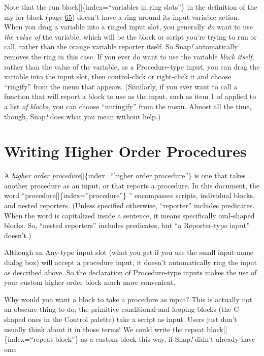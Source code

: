 \documentclass[
  letterpaper,
]{book}
\begin{document}
Note that the run block{[}{]}\{index=``variables in ring slots''\} in
the definition of the my for block (page \hyperref[call-and-run]{65})
doesn't have a ring around its input variable action. When you drag a
variable into a ringed input slot, you generally \emph{do} want to use
\emph{the value of} the variable, which will be the block or script
you're trying to run or call, rather than the orange variable reporter
itself. So Snap\emph{!} automatically removes the ring in this case. If
you ever do want to use the variable \emph{block itself,} rather than
the value of the variable, as a Procedure-type input, you can drag the
variable into the input slot, then control-click or right-click it and
choose ``ringify'' from the menu that appears. (Similarly, if you ever
want to call a function that will report a block to use as the input,
such as item 1 of applied to a list \emph{of blocks,} you can choose
``unringify'' from the menu. Almost all the time, though, Snap\emph{!}
does what you mean without help.)

\section{Writing Higher Order
Procedures}\label{writing-higher-order-procedures}

A \emph{higher order procedure}{[}{]}\{index=``higher order
procedure''\} is one that takes another procedure as an input, or that
reports a procedure. In this document, the word
``procedure{[}{]}\{index=''procedure''\} '' encompasses scripts,
individual blocks, and nested reporters. (Unless specified otherwise,
``reporter'' includes predicates. When the word is capitalized inside a
sentence, it means specifically oval-shaped blocks. So, ``nested
reporters'' includes predicates, but ``a Reporter-type input'' doesn't.)

Although an Any-type input slot (what you get if you use the small
input-name dialog box) will accept a procedure input, it doesn't
automatically ring the input as described above. So the declaration of
Procedure-type inputs makes the use of your custom higher order block
much more convenient.

Why would you want a block to take a procedure as input? This is
actually not an obscure thing to do; the primitive conditional and
looping blocks (the C-shaped ones in the Control palette) take a script
as input. Users just don't usually think about it in those terms! We
could write the repeat block{[}{]}\{index=``repeat block''\} as a custom
block this way, if Snap\emph{!} didn't already have one:
\end{document}
